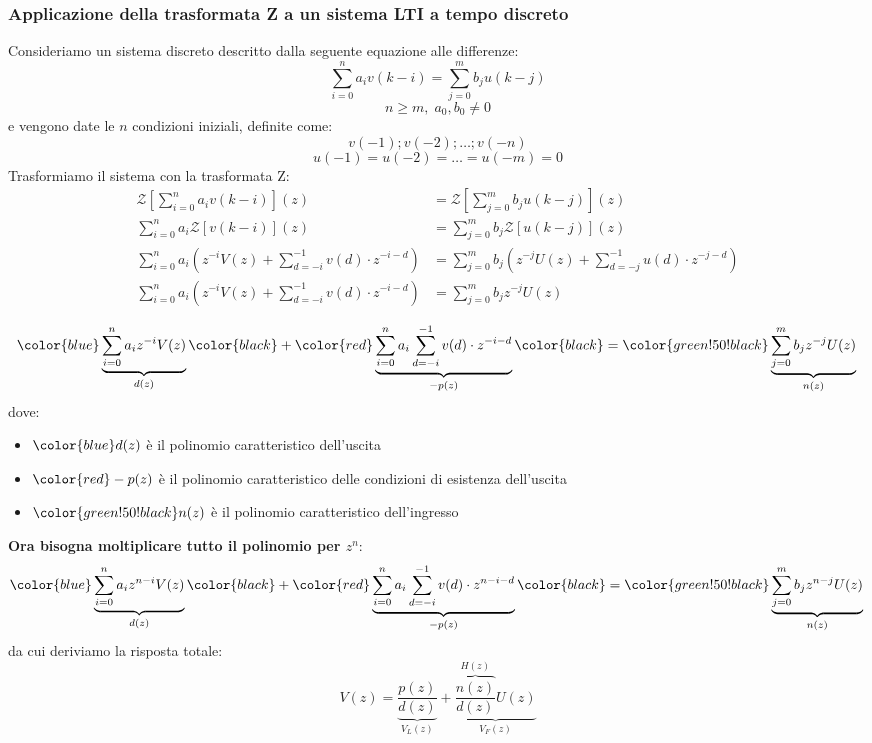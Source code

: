 \documentclass[a4paper]{article}
\begin{document}
\subsubsection{Applicazione della trasformata Z a un sistema LTI a tempo discreto}
Consideriamo un sistema discreto descritto dalla seguente equazione alle differenze:
\[
  \sum_{i=0}^{n} a_i v(k-i) = \sum_{j=0}^{m} b_j u(k-j)
\] 
\[
  n \ge m ,\; a_0, b_0 \neq 0
\] 
e vengono date le \( n \) condizioni iniziali, definite come:
\[
  v(-1); v(-2); \ldots; v(-n)
\] 
\[
  u(-1) = u(-2) = \ldots = u(-m) = 0
\] 
Trasformiamo il sistema con la trasformata Z:
\[
  \begin{aligned}
    \mathcal{Z} \left[ \sum_{i=0}^{n} a_i v(k-i) \right](z) &=
    \mathcal{Z} \left[ \sum_{j=0}^{m} b_j u(k-j) \right](z) \\
    \sum_{i=0}^{n} a_i \mathcal{Z} \left[ v(k-i) \right](z) &= 
    \sum_{j=0}^{m} b_j \mathcal{Z} \left[ u(k-j) \right](z) \\
    \sum_{i=0}^{n} a_i \left( z^{-i} V(z) + \sum_{d=-i}^{-1} v(d) \cdot z^{-i-d} \right) &=
    \sum_{j=0}^{m} b_j \left( z^{-j} U(z) + \sum_{d=-j}^{-1} u(d) \cdot z^{-j-d} \right)\\
    \sum_{i=0}^{n} a_i \left( z^{-i} V(z) + \sum_{d=-i}^{-1} v(d) \cdot z^{-i-d} \right) &=
    \sum_{j=0}^{m} b_j z^{-j} U(z)\\
  \end{aligned}
\] 
\[
  \color{blue}\underbrace{\sum_{i=0}^{n} a_i z^{-i} V(z)}_{d(z)}
  \color{black}+ \color{red}\underbrace{\sum_{i=0}^{n} a_i \sum_{d=-i}^{-1} v(d) \cdot z^{-i-d}}_{-p(z)}
  \color{black}=
  \color{green!50!black}\underbrace{\sum_{j=0}^{m} b_j z^{-j} U(z)}_{n(z)}\\
\] 
dove:
\begin{itemize}
  \item \( \color{blue}d(z) \) è il polinomio caratteristico dell'uscita
  \item \( \color{red}-p(z) \) è il polinomio caratteristico delle condizioni di
    esistenza dell'uscita
  \item \( \color{green!50!black}n(z) \) è il polinomio caratteristico dell'ingresso
\end{itemize}
\textbf{Ora bisogna moltiplicare tutto il polinomio per \( z^n \)}:
\[
  \color{blue}\underbrace{\sum_{i=0}^{n} a_i z^{n-i} V(z)}_{d(z)} \color{black}+
  \color{red}\underbrace{\sum_{i=0}^{n} a_i \sum_{d=-i}^{-1} v(d) \cdot z^{n-i-d}}_{-p(z)}
  \color{black}=
  \color{green!50!black}\underbrace{\sum_{j=0}^{m} b_j z^{n-j} U(z)}_{n(z)}\\
\] 
da cui deriviamo la risposta totale:
\[
  V(z) = \underbrace{\frac{p(z)}{d(z)}}_{V_L(z)} + 
  \underbrace{\overbrace{\frac{n(z)}{d(z)}}^{H(z)} U(z)}_{V_F(z)}
\] 
\end{document}
